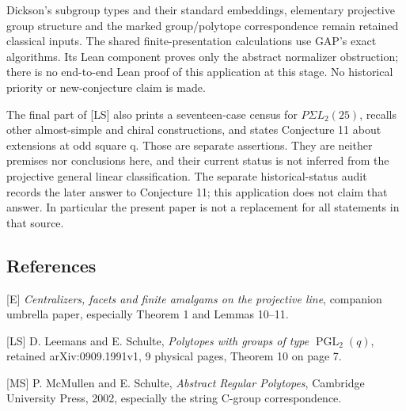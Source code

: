 \documentclass[
  11pt,
  a4paper,
]{article}
\begin{document}
Dickson's subgroup types and their standard embeddings, elementary
projective group structure and the marked group/polytope correspondence
remain retained classical inputs. The shared finite-presentation
calculations use GAP's exact algorithms. Its Lean component proves only
the abstract normalizer obstruction; there is no end-to-end Lean proof
of this application at this stage. No historical priority or
new-conjecture claim is made.

The final part of {[}LS{]} also prints a seventeen-case census for
\(P\Sigma L_2(25)\), recalls other almost-simple and chiral
constructions, and states Conjecture 11 about extensions at odd square
q. Those are separate assertions. They are neither premises nor
conclusions here, and their current status is not inferred from the
projective general linear classification. The separate historical-status
audit records the later answer to Conjecture 11; this application does
not claim that answer. In particular the present paper is not a
replacement for all statements in that source.

\subsection{References}\label{references}

{[}E{]} \emph{Centralizers, facets and finite amalgams on the projective
line}, companion umbrella paper, especially Theorem 1 and Lemmas 10--11.

{[}LS{]} D. Leemans and E. Schulte, \emph{Polytopes with groups of type
\(\operatorname{PGL}_2(q)\)}, retained arXiv:0909.1991v1, 9 physical
pages, Theorem 10 on page 7.

{[}MS{]} P. McMullen and E. Schulte, \emph{Abstract Regular Polytopes},
Cambridge University Press, 2002, especially the string C-group
correspondence.
\end{document}
